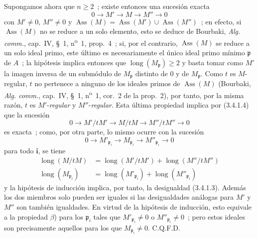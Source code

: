 Supongamos ahora que $n\geqslant2$~; existe entonces una sucesión exacta
\[
0\longrightarrow M'\longrightarrow M\longrightarrow M''\longrightarrow0
\]
con $M'\neq0$, $M''\neq0$ y
$\operatorname{Ass}(M)=\operatorname{Ass}(M')\cup\operatorname{Ass}(M'')$~;
en efecto, si $\operatorname{Ass}(M)$ no se reduce a un solo elemento, esto
se deduce de Bourbaki, \emph{Alg. comm.}, cap.~IV, \S~1,
n\textsuperscript{o}~1, prop.~4~; si, por el contrario, $\operatorname{Ass}(M)$ se reduce a
un solo ideal primo, este último es necesariamente el único ideal primo mínimo
$\mathfrak p$ de $A$~; la hipótesis implica entonces que
$\operatorname{long}(M_{\mathfrak p})\geqslant2$ y basta tomar como $M'$ la
imagen inversa de un submódulo de $M_{\mathfrak p}$ distinto de $0$
y de $M_{\mathfrak p}$. Como $t$ es $M$-regular, $t$ no pertenece a ninguno
de los ideales primos de $\operatorname{Ass}(M)$ (Bourbaki,
\emph{Alg. comm.}, cap.~IV, \S~1, n\textsuperscript{o}~1, cor.~2 de la
prop.~2), por tanto, por la misma razón, $t$ es $M'$-\emph{regular} y
$M''$-\emph{regular}. Esta última propiedad implica por (3.4.1.4) que la sucesión
\[
0\longrightarrow M'/tM'\longrightarrow M/tM
\longrightarrow M''/tM''\longrightarrow0
\]
es exacta~; como, por otra parte, lo mismo ocurre con la sucesión
\[
0\longrightarrow M'_{\mathfrak p_i}\longrightarrow M_{\mathfrak p_i}
\longrightarrow M''_{\mathfrak p_i}\longrightarrow0
\]
para todo $\boldsymbol{i}$, se tiene
\[
\begin{aligned}
\operatorname{long}(M/tM)
&=\operatorname{long}(M'/tM')+\operatorname{long}(M''/tM'')\\
\operatorname{long}(M_{\mathfrak p_i})
&=\operatorname{long}(M'_{\mathfrak p_i})
 +\operatorname{long}(M''_{\mathfrak p_i})
\end{aligned}
\]
y la hipótesis de inducción implica, por tanto, la desigualdad (3.4.1.3). Además
los dos miembros solo pueden ser iguales si las desigualdades análogas para
$M'$ y $M''$ son también igualdades. En virtud de la hipótesis de inducción,
esto equivale a la propiedad $\beta$) para los $\mathfrak p_i$ tales que
$M'_{\mathfrak p_i}\neq0$ o $M''_{\mathfrak p_i}\neq0$~; pero estos ideales son
precisamente aquellos para los que $M_{\mathfrak p_i}\neq0$. C.Q.F.D.

